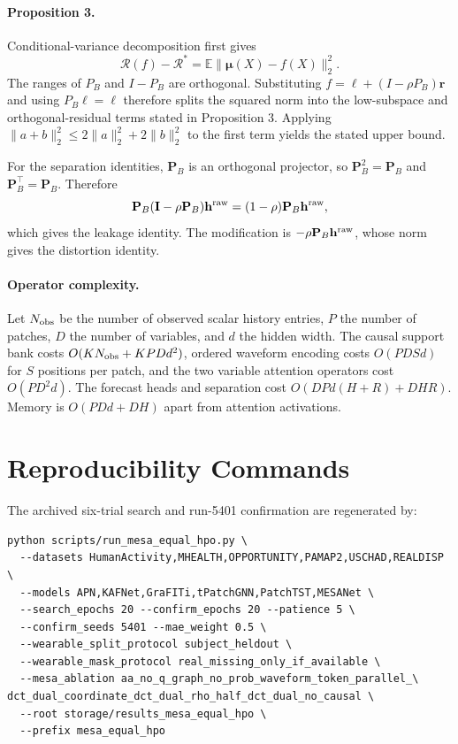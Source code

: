 \documentclass[letterpaper,10pt]{article}
\begin{document}
\paragraph{Proposition 3.}
Conditional-variance decomposition first gives
\begin{equation}
\mathcal R(f)-\mathcal R^*
=\mathbb E\|\boldsymbol\mu(X)-f(X)\|_2^2.
\end{equation}
The ranges of $P_B$ and $I-P_B$ are orthogonal. Substituting
$f=\boldsymbol\ell+(I-\rho P_B)\mathbf r$ and using
$P_B\boldsymbol\ell=\boldsymbol\ell$ therefore splits the squared norm into
the low-subspace and orthogonal-residual terms stated in Proposition 3.
Applying $\|a+b\|_2^2\leq2\|a\|_2^2+2\|b\|_2^2$ to the first term yields
the stated upper bound.

For the separation identities, $\mathbf P_B$ is an orthogonal projector, so
$\mathbf P_B^2=\mathbf P_B$ and $\mathbf P_B^\top=\mathbf P_B$. Therefore
\begin{equation}
\mathbf P_B(\mathbf I-\rho\mathbf P_B)\mathbf h^{\rm raw}
=(1-\rho)\mathbf P_B\mathbf h^{\rm raw},
\end{equation}
which gives the leakage identity. The modification is
$-\rho\mathbf P_B\mathbf h^{\rm raw}$, whose norm gives the distortion
identity.

\paragraph{Operator complexity.}
Let $N_{\rm obs}$ be the number of observed scalar history entries, $P$ the
number of patches, $D$ the number of variables, and $d$ the hidden width.
The causal support bank costs $O(KN_{\rm obs}+KPDd^2)$, ordered waveform
encoding costs $O(PDSd)$ for $S$ positions per patch, and the two variable
attention operators cost $O(PD^2d)$. The forecast heads and separation cost
$O(DPd(H+R)+DHR)$. Memory is $O(PDd+DH)$ apart from attention activations.

\section{Reproducibility Commands}

The archived six-trial search and run-5401 confirmation are regenerated by:
\begin{verbatim}
python scripts/run_mesa_equal_hpo.py \
  --datasets HumanActivity,MHEALTH,OPPORTUNITY,PAMAP2,USCHAD,REALDISP \
  --models APN,KAFNet,GraFITi,tPatchGNN,PatchTST,MESANet \
  --search_epochs 20 --confirm_epochs 20 --patience 5 \
  --confirm_seeds 5401 --mae_weight 0.5 \
  --wearable_split_protocol subject_heldout \
  --wearable_mask_protocol real_missing_only_if_available \
  --mesa_ablation aa_no_q_graph_no_prob_waveform_token_parallel_\
dct_dual_coordinate_dct_dual_rho_half_dct_dual_no_causal \
  --root storage/results_mesa_equal_hpo \
  --prefix mesa_equal_hpo
\end{verbatim}
\end{document}
